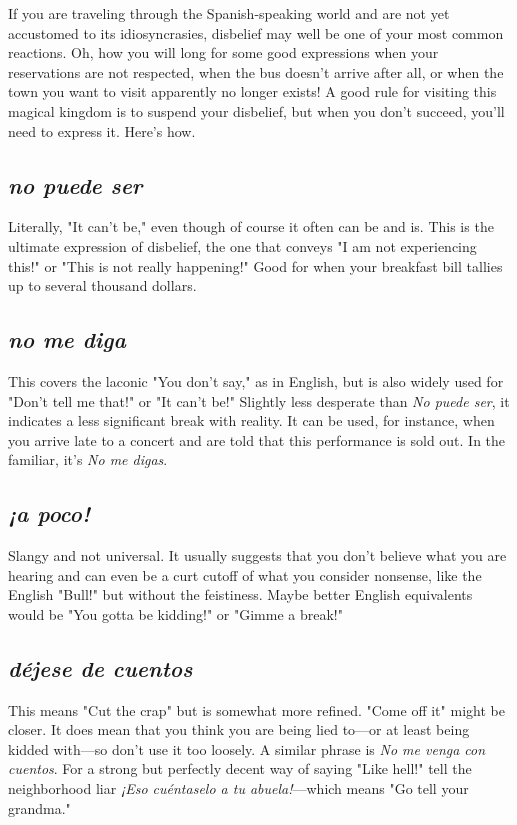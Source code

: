 If you are traveling through the Spanish-speaking world and
are not yet accustomed to its idiosyncrasies, disbelief may well be one
of your most common reactions. Oh, how you will long for some good
expressions when your reservations are not respected, when the bus
doesn't arrive after all, or when the town you want to visit apparently
no longer exists! A good rule for visiting this magical kingdom is to
suspend your disbelief, but when you don't succeed, you'll need to express it. Here's how.

\subsection{\emph{no puede ser}}

Literally, "It can't be," even though of course it often can be
and is. This is the ultimate expression of disbelief, the one that conveys "I am not experiencing this!" or "This is not really happening!"
Good for when your breakfast bill tallies up to several thousand
dollars.

\subsection{\emph{no me diga}}

This covers the laconic "You don't say," as in English, but is
also widely used for "Don't tell me that!" or "It can't be!" Slightly less
desperate than \emph{No puede ser}, it indicates a less significant break with
reality. It can be used, for instance, when you arrive late to a concert
and are told that this performance is sold out. In the familiar, it's \emph{No me digas}.

\subsection{\emph{¡a poco!}}

Slangy and not universal. It usually suggests that you don't believe what you are hearing and can even be a curt cutoff of what you
consider nonsense, like the English "Bull!" but without the feistiness.
Maybe better English equivalents would be "You gotta be kidding!" or
"Gimme a break!"

\subsection{\emph{déjese de cuentos}}

This means "Cut the crap" but is somewhat more refined.
"Come off it" might be closer. It does mean that you think you are
being lied to---or at least being kidded with---so don't use it too loosely.
A similar phrase is \emph{No me venga con cuentos}. For a strong but
perfectly decent way of saying "Like hell!" tell the neighborhood liar \emph{¡Eso
cuéntaselo a tu abuela!}---which means "Go tell your grandma."

